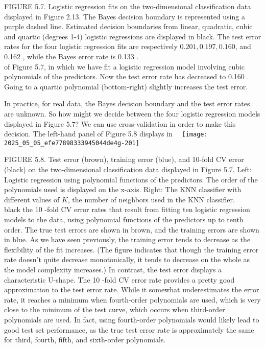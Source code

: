 \documentclass[10pt]{article}
\begin{document}
FIGURE 5.7. Logistic regression fits on the two-dimensional classification data displayed in Figure 2.13. The Bayes decision boundary is represented using a purple dashed line. Estimated decision boundaries from linear, quadratic, cubic and quartic (degrees 1-4) logistic regressions are displayed in black. The test error rates for the four logistic regression fits are respectively $0.201,0.197,0.160$, and 0.162 , while the Bayes error rate is 0.133 .\\
of Figure 5.7, in which we have fit a logistic regression model involving cubic polynomials of the predictors. Now the test error rate has decreased to 0.160 . Going to a quartic polynomial (bottom-right) slightly increases the test error.

In practice, for real data, the Bayes decision boundary and the test error rates are unknown. So how might we decide between the four logistic regression models displayed in Figure 5.7? We can use cross-validation in order to make this decision. The left-hand panel of Figure 5.8 displays in\
\
\texttt{[image: 2025\_05\_05\_efe77898333945044de4g-201]}

FIGURE 5.8. Test error (brown), training error (blue), and 10-fold CV error (black) on the two-dimensional classification data displayed in Figure 5.7. Left: Logistic regression using polynomial functions of the predictors. The order of the polynomials used is displayed on the x-axis. Right: The KNN classifier with different values of $K$, the number of neighbors used in the KNN classifier.\\
black the 10 -fold CV error rates that result from fitting ten logistic regression models to the data, using polynomial functions of the predictors up to tenth order. The true test errors are shown in brown, and the training errors are shown in blue. As we have seen previously, the training error tends to decrease as the flexibility of the fit increases. (The figure indicates that though the training error rate doesn't quite decrease monotonically, it tends to decrease on the whole as the model complexity increases.) In contrast, the test error displays a characteristic U-shape. The 10 -fold CV error rate provides a pretty good approximation to the test error rate. While it somewhat underestimates the error rate, it reaches a minimum when fourth-order polynomials are used, which is very close to the minimum of the test curve, which occurs when third-order polynomials are used. In fact, using fourth-order polynomials would likely lead to good test set performance, as the true test error rate is approximately the same for third, fourth, fifth, and sixth-order polynomials.
\end{document}
